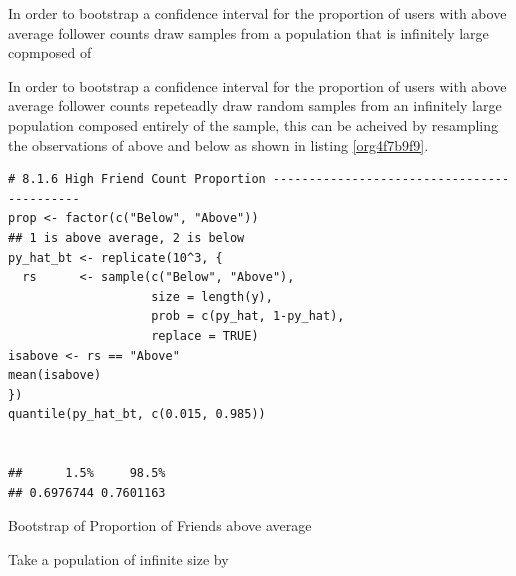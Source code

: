 \documentclass[11pt]{article}
\begin{document}
In order to bootstrap a confidence interval for the proportion of users with
above average follower counts draw samples from a population that is infinitely large copmposed of

In order to bootstrap a confidence interval for the proportion of users with
above average follower counts repeteadly draw random samples from an infinitely large population composed entirely of the sample, this can be acheived by resampling the observations of above and below as shown in listing \ref{org4f7b9f9}.

\begin{listing}[htbp]
\begin{verbatim}
# 8.1.6 High Friend Count Proportion -------------------------------------------
prop <- factor(c("Below", "Above"))
## 1 is above average, 2 is below
py_hat_bt <- replicate(10^3, {
  rs      <- sample(c("Below", "Above"),
                    size = length(y),
                    prob = c(py_hat, 1-py_hat),
                    replace = TRUE)
isabove <- rs == "Above"
mean(isabove)
})
quantile(py_hat_bt, c(0.015, 0.985))


##      1.5%     98.5%
## 0.6976744 0.7601163
\end{verbatim}
\caption{\label{org4f7b9f9}Bootstrap of Proportion of Friends above average}
\end{listing}


Take a population of infinite size by
\end{document}
